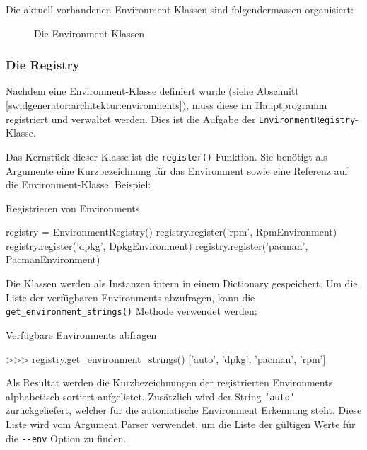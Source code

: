 Die aktuell vorhandenen Environment-Klassen sind folgendermassen organisiert:

\begin{figure}[H]
	\centering
	\resizebox{\textwidth}{!}{%
		
	}
	\caption{Die Environment-Klassen}
	\label{img:environment-klassendiagramm}
\end{figure}


\subsubsection{Die Registry}
\label{swidgenerator:architektur:environments:registry}

Nachdem eine Environment-Klasse definiert wurde (siehe Abschnitt
\ref{swidgenerator:architektur:environments}), muss diese im Hauptprogramm
registriert und verwaltet werden. Dies ist die Aufgabe der
\texttt{EnvironmentRegistry}-Klasse.

Das Kernstück dieser Klasse ist die \texttt{register()}-Funktion. Sie benötigt als
Argumente eine Kurzbezeichnung für das Environment sowie eine Referenz auf die
Environment-Klasse. Beispiel:
\begin{listing}[H]
\caption{Registrieren von Environments}
\begin{pythoncode}
registry = EnvironmentRegistry()
registry.register('rpm', RpmEnvironment)
registry.register('dpkg', DpkgEnvironment)
registry.register('pacman', PacmanEnvironment)
\end{pythoncode}
\end{listing}

Die Klassen werden als Instanzen intern in einem Dictionary gespeichert. Um die
Liste der verfügbaren Environments abzufragen, kann die
\texttt{get\_environment\_strings()} Methode verwendet werden:

\begin{listing}[H]
\caption{Verfügbare Environments abfragen}
\begin{pythoncode}
>>> registry.get_environment_strings()
['auto', 'dpkg', 'pacman', 'rpm']
\end{pythoncode}
\end{listing}

Als Resultat werden die Kurzbezeichnungen der registrierten Environments
alphabetisch sortiert aufgelistet. Zusätzlich wird der String \texttt{'auto'}
zurückgeliefert, welcher für die automatische Environment Erkennung steht. Diese
Liste wird vom Argument Parser verwendet, um die Liste der gültigen Werte für die
\texttt{-{}-env} Option zu finden.

